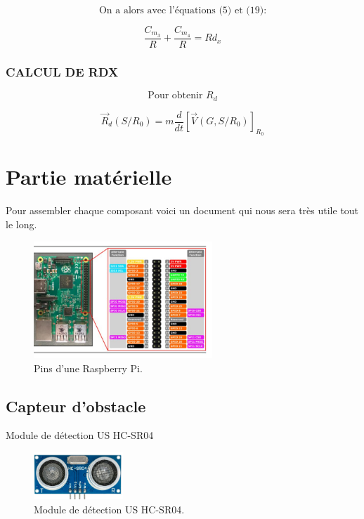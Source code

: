 \documentclass[a4paper,12pt]{report}  %
\begin{document}
$$
\text{On a alors avec l'équations (5) et (19):}
$$


$$
\frac{C_{m_3}}{R} + \frac{C_{m_4}}{R} = Rd_x 
$$






\subsubsection{CALCUL DE RDX}

$$
\text{Pour obtenir } R_d
$$

$$
\vec{R}_d(S/R_0) = m \frac{d}{dt} [ \vec{V}(G,S/R_0) ]_{R_0}
$$



\pagebreak


\section{Partie matérielle}
Pour assembler chaque composant voici un document qui nous sera très utile tout le long. 

\begin{figure}[H]
	\centering
	\includegraphics[width=0.6\textwidth]{./attachments/raspberry_pi_pin_map.jpg}
	\caption{Pins d'une Raspberry Pi. }
\end{figure}

\subsection{Capteur d’obstacle}
Module de détection US HC-SR04 
\begin{figure}[H]
	\centering
	\includegraphics[width=0.3\textwidth]{./attachments/capteur_ultrason.jpg}
	\caption{Module de détection US HC-SR04.}
	\label{fig:capteur_us}
	
\end{figure}
\end{document}
